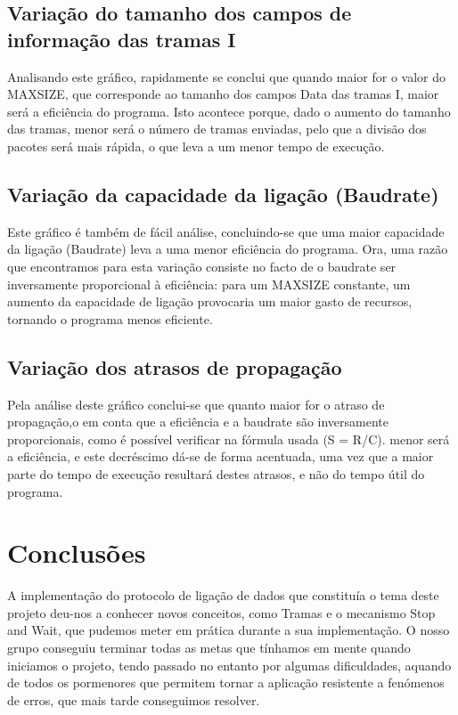 \documentclass[article, a4paper, 11pt, oneside]{memoir}
\begin{document}
\section{Variação do tamanho dos campos de informação das tramas I}

Analisando este gráfico, rapidamente se conclui que quando maior for o valor do MAX\textunderscore SIZE, que corresponde ao tamanho dos campos Data das tramas I,
maior será a eficiência do programa. Isto acontece porque, dado o aumento do tamanho das tramas, menor será o número de tramas enviadas, pelo que a
divisão dos pacotes será mais rápida, o que leva a um menor tempo de execução.

\section{Variação da capacidade da ligação (Baudrate)}

Este gráfico é também de fácil análise, concluindo-se que uma maior capacidade da ligação (Baudrate) leva a uma menor eficiência do programa.
Ora, uma razão que encontramos para esta variação consiste no facto de o baudrate ser inversamente proporcional à eficiência: para um MAX\textunderscore SIZE constante, um aumento
da capacidade de ligação provocaria um maior gasto de recursos, tornando o programa menos eficiente.

\section{Variação dos atrasos de propagação}

Pela análise deste gráfico conclui-se que quanto maior for o atraso de propagação,o em conta que a eficiência e a baudrate são
inversamente proporcionais, como é possível verificar na fórmula usada (S = R/C). menor será a eficiência, e este decréscimo
dá-se de forma acentuada, uma vez que a maior parte do tempo de execução resultará destes atrasos, e não do tempo útil do programa.

\chapter[Conclusões][Conclusões]{Conclusões} \label{\thechapter}

A implementação do protocolo de ligação de dados que constituía o tema deste projeto deu-nos a conhecer novos conceitos, como Tramas e o mecanismo Stop and Wait, 
que pudemos meter em prática durante a sua implementação. O nosso grupo conseguiu terminar todas as metas que tínhamos em mente quando iniciamos o projeto,
 tendo passado no entanto por algumas dificuldades, aquando de todos os pormenores que permitem tornar a aplicação resistente a fenómenos de erros, que mais tarde conseguimos resolver. 
\end{document}
